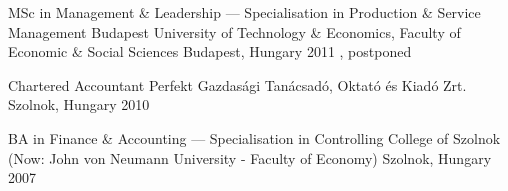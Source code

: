


\begin{cventries}


  \cventry
    {MSc in Management \& Leadership — Specialisation in Production \& Service Management} %
    {Budapest University of Technology \& Economics, Faculty of Economic \& Social Sciences} %
    {Budapest, Hungary} %
    {2011 , postponed} %
    {} %
    {} %


  \cventry
    {Chartered Accountant} %
    {Perfekt Gazdasági Tanácsadó, Oktató és Kiadó Zrt.} %
    {Szolnok, Hungary} %
    {2010 } %
    {} %
    {} %


  \cventry
    {BA in Finance \& Accounting — Specialisation in Controlling} %
    {College of Szolnok (Now: John von Neumann University - Faculty of Economy)} %
    {Szolnok, Hungary} %
    {2007 } %
    {} %
    {} %
    

\end{cventries}
